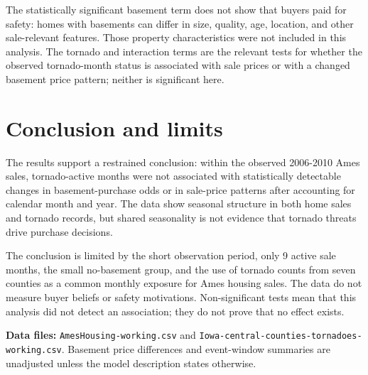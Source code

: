 ﻿\documentclass[11pt]{article}
\begin{document}
The statistically significant basement term does not show that buyers paid for safety: homes with basements can differ in size, quality, age, location, and other sale-relevant features. Those property characteristics were not included in this analysis. The tornado and interaction terms are the relevant tests for whether the observed tornado-month status is associated with sale prices or with a changed basement price pattern; neither is significant here.

\section*{Conclusion and limits}
The results support a restrained conclusion: within the observed 2006-2010 Ames sales, tornado-active months were not associated with statistically detectable changes in basement-purchase odds or in sale-price patterns after accounting for calendar month and year. The data show seasonal structure in both home sales and tornado records, but shared seasonality is not evidence that tornado threats drive purchase decisions.

The conclusion is limited by the short observation period, only 9 active sale months, the small no-basement group, and the use of tornado counts from seven counties as a common monthly exposure for Ames housing sales. The data do not measure buyer beliefs or safety motivations. Non-significant tests mean that this analysis did not detect an association; they do not prove that no effect exists.

\textbf{Data files:} \texttt{AmesHousing-working.csv} and \texttt{Iowa-central-counties-tornadoes-working.csv}. Basement price differences and event-window summaries are unadjusted unless the model description states otherwise.
\end{document}

